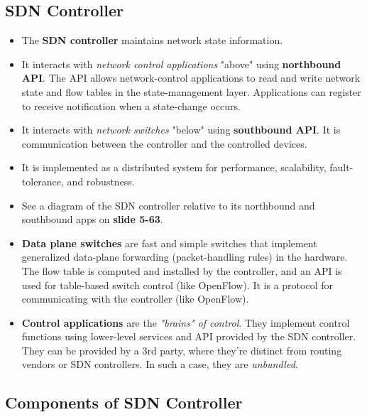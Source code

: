 \documentclass{article}
\begin{document}
\subsection{SDN Controller}

\begin{itemize}
\item The {\bf SDN controller} maintains network state information.
\item It interacts with \emph{network control applications} "above" using {\bf northbound API}. The API allows network-control applications to read and write network state and flow tables in the state-management layer. Applications can register to receive notification when a state-change occurs.
\item It interacts with \emph{network switches} "below" using {\bf southbound API}. It is communication between the controller and the controlled devices.
\item It is implemented as a distributed system for performance, scalability, fault-tolerance, and robustness.
\item See a diagram of the SDN controller relative to its northbound and southbound apps on {\bf slide 5-63}.
\item {\bf Data plane switches} are fast and simple switches that implement generalized data-plane forwarding (packet-handling rules) in the hardware. The flow table is computed and installed by the controller, and an API is used for table-based switch control (like OpenFlow). It is a protocol for communicating with the controller (like OpenFlow).
\item {\bf Control applications} are the \emph{"brains" of control}. They implement control functions using lower-level services and API provided by the SDN controller. They can be provided by a 3rd party, where they're distinct from routing vendors or SDN controllers. In such a case, they are \emph{unbundled}.
\end{itemize}

\subsection{Components of SDN Controller}
\end{document}
